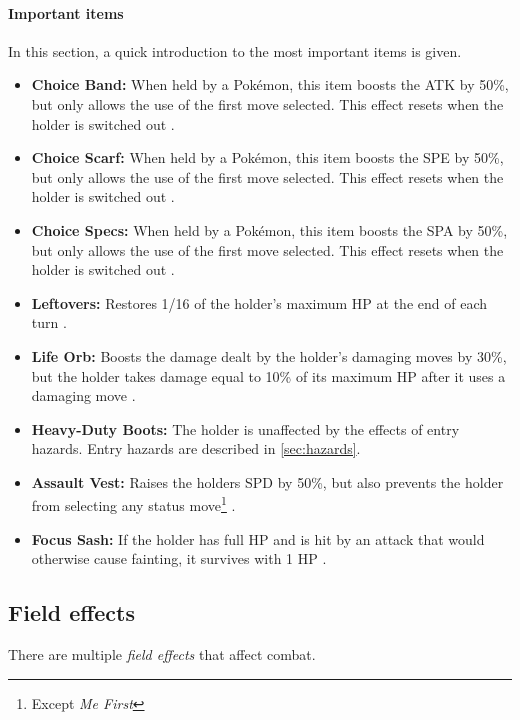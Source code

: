 \paragraph{Important items}
\label{sec:Important-items}
In this section, a quick introduction to the most important items is given.
\begin{itemize}
	\item \textbf{Choice Band:} When held by a Pokémon, this item boosts the \ac{ATK} by 50\%, but only
	allows the use of the first move selected. This effect resets when the holder is switched out \cite{Bulbapedia:ChoiceBand}. 
	\item \textbf{Choice Scarf:} When held by a Pokémon, this item boosts the \ac{SPE} by 50\%, but only
	allows the use of the first move selected. This effect resets when the holder is switched out \cite{Bulbapedia:ChoiceScarf}. 
	\item \textbf{Choice Specs:} When held by a Pokémon, this item boosts the \ac{SPA} by 50\%, but only
	allows the use of the first move selected. This effect resets when the holder is switched out \cite{Bulbapedia:ChoiceSpecs}. 
	\item \textbf{Leftovers:} Restores 1/16 of the holder's maximum \ac{HP} at the end of each turn \cite{Bulbapedia:Leftovers}.
	\item \textbf{Life Orb:} Boosts the damage dealt by the holder's damaging moves by 30\%, but the holder takes damage 
	equal to 10\% of its maximum \ac{HP} after it uses a damaging move \cite{Bulbapedia:LifeOrb}.
	\item \textbf{Heavy-Duty Boots:} The holder is unaffected by the effects of entry hazards. Entry hazards are described 
	in \ref{sec:hazards}.
	\item \textbf{Assault Vest:} Raises the holders \ac{SPD} by 50\%, but also prevents the holder from selecting any 
	status move\footnote{Except \textit{Me First}} \cite{Bulbapedia:AssaultVest}.
	\item \textbf{Focus Sash:} If the holder has full \ac{HP} and is hit by an attack that would otherwise cause fainting,
	it survives with 1 \ac{HP} \cite{Bulbapedia:FocusSash}.
\end{itemize}

\subsection{Field effects}
\label{sec:field-effects}
There are multiple \textit{field effects} that affect combat.
